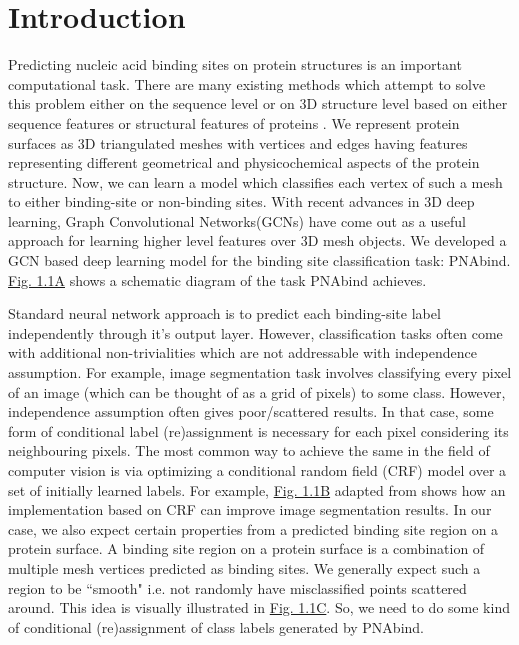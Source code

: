 \section{Introduction} Predicting nucleic acid binding sites on protein structures is an important computational task.  There are many existing methods which attempt to solve this problem either on the sequence level or on 3D structure level based on either sequence features or structural features of proteins \citep{deng2018pdrlgb, wang2010bindn+, wang2006bindn, li2013predna}.
We represent protein surfaces as 3D triangulated meshes with 
vertices and edges having features representing different geometrical and physicochemical aspects of the protein structure. Now, we can learn a model which classifies each vertex of such a mesh to either binding-site or
non-binding sites. With recent advances in 3D deep learning, Graph Convolutional
Networks(GCNs) have come out as a useful approach for learning higher level features over
3D mesh objects. We developed a GCN based deep learning model for the binding site classification
task: PNAbind. \hyperref[fig:crf_concept]{Fig. 1.1A} shows a schematic diagram of
the task PNAbind achieves.

Standard neural network approach is to predict each binding-site label independently
through it's output layer. However, classification tasks often come with additional non-trivialities which
are not addressable with independence assumption.  For example, image segmentation task involves
classifying every pixel of an image (which can be thought of as a grid of pixels) to some class.
However, independence assumption often gives poor/scattered results. In that case, some form of
conditional label (re)assignment is necessary for each pixel considering its neighbouring pixels. The
most common way to achieve the same in the field of computer vision is via optimizing a conditional
random  field (CRF) model over a set of initially  learned labels. For example,
\hyperref[fig:crf_concept]{Fig. 1.1B} adapted
from \citet{krahenbuhl2012efficient}  shows how an implementation based on CRF can improve image
segmentation results. In our case, we also expect certain properties from a predicted binding site
region on a protein surface. A binding site region on a protein surface is a combination
of multiple mesh vertices predicted as binding sites. We generally expect such a region to be
``smooth" i.e. not randomly have misclassified points scattered around. This idea is visually illustrated in
\hyperref[fig:crf_concept]{Fig. 1.1C}. So, we need to do some kind
of conditional (re)assignment of class labels generated by PNAbind.

